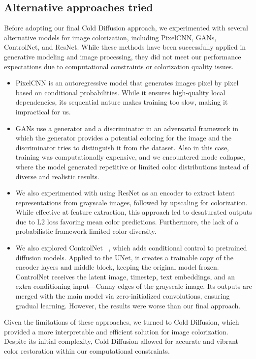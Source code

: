 \documentclass[10pt,twocolumn,letterpaper]{article}
\begin{document}
\subsection{Alternative approaches tried}

Before adopting our final Cold Diffusion approach, we experimented with several alternative models for image colorization, including PixelCNN, GANs, ControlNet, and ResNet. While these methods have been successfully applied in generative modeling and image processing, they did not meet our performance expectations due to computational constraints or colorization quality issues.

\begin{itemize}
\item PixelCNN is an autoregressive model that generates images pixel by pixel based on conditional probabilities. While it ensures high-quality local dependencies, its sequential nature makes training too slow, making it impractical for us.
\item GANs use a generator and a discriminator in an adversarial framework in which the generator provides a potential coloring for the image and the discriminator tries to distinguish it from the dataset. Also in this case, training was computationally expensive, and we encountered mode collapse, where the model generated repetitive or limited color distributions instead of diverse and realistic results.
\item We also experimented with using ResNet as an encoder to extract latent representations from grayscale images, followed by upscaling for colorization. While effective at feature extraction, this approach led to desaturated outputs due to L2 loss favoring mean color predictions. Furthermore, the lack of a probabilistic framework limited color diversity. 
\item We also explored ControlNet ~\cite{ControlNet}, which adds conditional control to pretrained diffusion models. Applied to the UNet, it creates a trainable copy of the encoder layers and middle block, keeping the original model frozen. ControlNet receives the latent image, timestep, text embeddings, and an extra conditioning input—Canny edges of the grayscale image. Its outputs are merged with the main model via zero-initialized convolutions, ensuring gradual learning. However, the results were worse than our final approach.
\end{itemize}

Given the limitations of these approaches, we turned to Cold Diffusion, which provided a more interpretable and efficient solution for image colorization. Despite its initial complexity, Cold Diffusion allowed for accurate and vibrant color restoration within our computational constraints.
\end{document}
